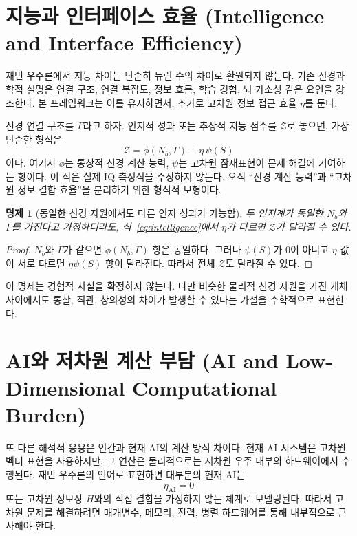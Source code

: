 \documentclass[11pt]{article}
\newtheorem{proposition}{명제}
\theoremstyle{remark}
\begin{document}
\section{지능과 인터페이스 효율 (Intelligence and Interface Efficiency)}

재민 우주론에서 지능 차이는 단순히 뉴런 수의 차이로 환원되지 않는다.
기존 신경과학적 설명은 연결 구조, 연결 복잡도, 정보 흐름, 학습 경험,
뇌 가소성 같은 요인을 강조한다. 본 프레임워크는 이를 유지하면서, 추가로
고차원 정보 접근 효율 $\eta$를 둔다.

신경 연결 구조를 $\Gamma$라고 하자. 인지적 성과 또는 추상적 지능 점수를
$\mathcal{Z}$로 놓으면, 가장 단순한 형식은
\begin{equation}
  \mathcal{Z}
  =
  \phi(N_b,\Gamma) + \eta\,\psi(S)
  \label{eq:intelligence}
\end{equation}
이다. 여기서 $\phi$는 통상적 신경 계산 능력, $\psi$는 고차원 잠재표현이
문제 해결에 기여하는 항이다. 이 식은 실제 IQ 측정식을 주장하지 않는다.
오직 ``신경 계산 능력''과 ``고차원 정보 결합 효율''을 분리하기 위한
형식적 모형이다.

\begin{proposition}[동일한 신경 자원에서도 다른 인지 성과가 가능함]
두 인지계가 동일한 $N_b$와 $\Gamma$를 가진다고 가정하더라도,
식~\eqref{eq:intelligence}에서 $\eta$가 다르면 $\mathcal{Z}$가 달라질 수
있다.
\end{proposition}

\begin{proof}
$N_b$와 $\Gamma$가 같으면 $\phi(N_b,\Gamma)$ 항은 동일하다. 그러나
$\psi(S)$가 0이 아니고 $\eta$ 값이 서로 다르면 $\eta\psi(S)$ 항이 달라진다.
따라서 전체 $\mathcal{Z}$도 달라질 수 있다.
\end{proof}

이 명제는 경험적 사실을 확정하지 않는다. 다만 비슷한 물리적 신경 자원을
가진 개체 사이에서도 통찰, 직관, 창의성의 차이가 발생할 수 있다는 가설을
수학적으로 표현한다.

\section{AI와 저차원 계산 부담 (AI and Low-Dimensional Computational Burden)}

또 다른 해석적 응용은 인간과 현재 AI의 계산 방식 차이다.
현재 AI 시스템은 고차원 벡터 표현을 사용하지만, 그 연산은 물리적으로는
저차원 우주 내부의 하드웨어에서 수행된다. 재민 우주론의 언어로 표현하면
대부분의 현재 AI는
\begin{equation}
  \eta_{\mathrm{AI}} = 0
\end{equation}
또는 고차원 정보장 $H$와의 직접 결합을 가정하지 않는 체계로 모델링된다.
따라서 고차원 문제를 해결하려면 매개변수, 메모리, 전력, 병렬 하드웨어를
통해 내부적으로 근사해야 한다.
\end{document}
